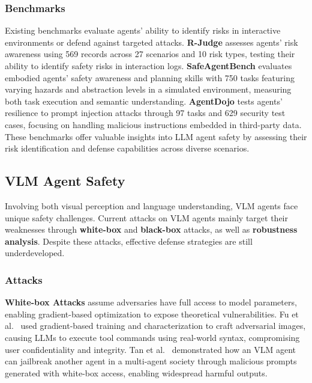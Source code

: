 \subsubsection{Benchmarks}
Existing benchmarks evaluate agents' ability to identify risks in interactive environments or defend against targeted attacks.  
\textbf{R-Judge} \cite{yuan2024r} assesses agents' risk awareness using 569 records across 27 scenarios and 10 risk types, testing their ability to identify safety risks in interaction logs.  
\textbf{SafeAgentBench} \cite{yin2024safeagentbench} evaluates embodied agents' safety awareness and planning skills with 750 tasks featuring varying hazards and abstraction levels in a simulated environment, measuring both task execution and semantic understanding. 
\textbf{AgentDojo} \cite{debenedetti2024agentdojo} tests agents' resilience to prompt injection attacks through 97 tasks and 629 security test cases, focusing on handling malicious instructions embedded in third-party data.  
These benchmarks offer valuable insights into LLM agent safety by assessing their risk identification and defense capabilities across diverse scenarios.


\subsection{VLM Agent Safety}
\label{sec:agent_VLM}

Involving both visual perception and language understanding, VLM agents face unique safety challenges. 
Current attacks on VLM agents mainly target their weaknesses through \textbf{white-box} and \textbf{black-box} attacks, as well as \textbf{robustness analysis}. Despite these attacks, effective defense strategies are still underdeveloped.

\subsubsection{Attacks}

\textbf{White-box Attacks} assume adversaries have full access to model parameters, enabling gradient-based optimization to expose theoretical vulnerabilities. Fu et al.~\cite{fu2023misusing} used gradient-based training  and characterization to craft adversarial images, causing LLMs to execute tool commands using real-world syntax, compromising user confidentiality and integrity. Tan et al.~\cite{tan2024wolf} demonstrated how an VLM agent can jailbreak another agent in a multi-agent society through malicious prompts generated with white-box access, enabling widespread harmful outputs.

